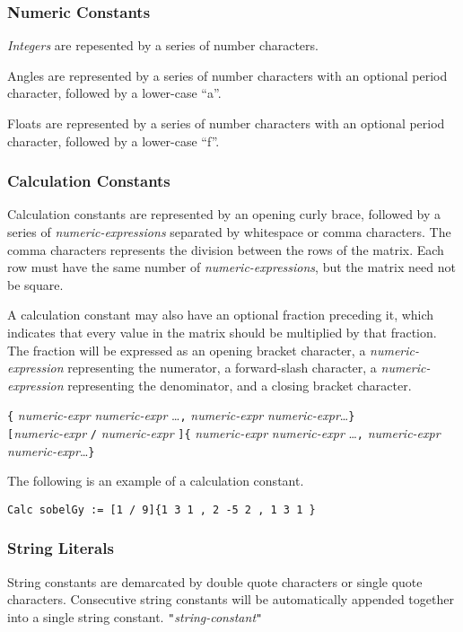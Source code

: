 \subsubsection{Numeric Constants}
\label{sssec:numericconstants}

\emph{Integers} are repesented by a series of number characters.

Angles are represented by a series of number characters with an
optional period character, followed by a lower-case ``a''.

Floats are represented by a series of number characters with an
optional period character, followed by a lower-case ``f''.

\subsubsection{Calculation Constants}
\label{sssec:calcconstants}
Calculation constants are represented by an opening curly brace, followed
by a series of \emph{numeric-expressions} separated by whitespace or
comma characters. The comma  characters represents the division between
the rows of the matrix. Each row must have the same number of
\emph{numeric-expressions}, but the matrix need not be square.

A calculation constant may also have an optional fraction preceding it,
which indicates that every value in the matrix should be multiplied
by that fraction. The fraction will be expressed as an opening
bracket character, a \emph{numeric-expression} representing the
numerator, a forward-slash character, a \emph{numeric-expression}
representing the denominator, and a closing bracket character.

\startsyn
\texttt{\{} \emph{numeric-expr} \emph{numeric-expr} \ldots \texttt{,} \emph{numeric-expr} \emph{numeric-expr}\ldots \texttt{\}} \\
\texttt{[}\emph{numeric-expr} \texttt{/} \emph{numeric-expr} \texttt{]}\texttt{\{} \emph{numeric-expr} \emph{numeric-expr} \ldots \texttt{,} \emph{numeric-expr} \emph{numeric-expr}\ldots \texttt{\}}
\stopsyn

The following is an example of a calculation constant.
\begin{lstlisting}[language=CLAM,escapechar=\%]
Calc sobelGy := [1 / 9]{1 3 1 , 2 -5 2 , 1 3 1 }
\end{lstlisting}

\subsubsection{String Literals}
\label{sssec:strings}

String constants are demarcated by double quote characters or single
quote characters. Consecutive string constants will be automatically
appended together into a single string constant.
\startsyn
\texttt{"}\emph{string-constant}\texttt{"}
\stopsyn
